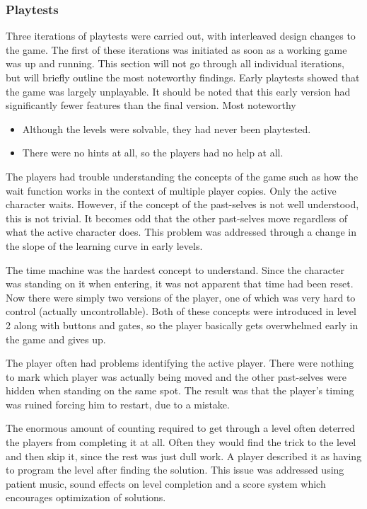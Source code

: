 \subsubsection{Playtests}
\label{sec:playtests}

Three iterations of playtests were carried out, with interleaved
design changes to the game. The first of these iterations was
initiated as soon as a working game was up and running. This section
will not go through all individual iterations, but will briefly
outline the most noteworthy findings.  Early playtests showed that
the game was largely unplayable. It should be noted that this early
version had significantly fewer features than the final version. Most
noteworthy

\begin{itemize}
\item Although the levels were solvable, they had never been playtested.
\item There were no hints at all, so the players had no help at all.
\end{itemize}

The players had trouble understanding the concepts of the game such as
how the wait function works in the context of multiple player
copies. Only the active character waits.  However, if the concept of the
past-selves is not well understood, this is not trivial. It becomes
odd that the other past-selves move regardless of what the active
character does. This problem was addressed through a change in the
slope of the learning curve in early levels.

The time machine was the hardest concept to understand. Since the
character was standing on it when entering, it was not apparent that
time had been reset. Now there were simply two versions of the player,
one of which was very hard to control (actually uncontrollable). Both
of these concepts were introduced in level 2 along with buttons and
gates, so the player basically gets overwhelmed early in the game and
gives up.

The player often had problems identifying the active player. There
were nothing to mark which player was actually being moved and the
other past-selves were hidden when standing on the same spot. The
result was that the player's timing was ruined forcing him to restart,
due to a mistake.

The enormous amount of counting required to get through a level often
deterred the players from completing it at all. Often they would find
the trick to the level and then skip it, since the rest was just dull
work. A player described it as having to program the level after
finding the solution. This issue was addressed using patient music,
sound effects on level completion and a score system which encourages
optimization of solutions.

